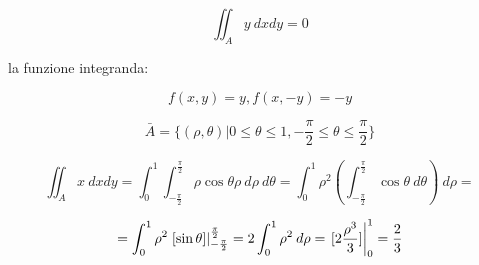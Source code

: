 \documentclass[../appunti-analisi.tex]{subfiles}
\begin{document}
\[
    \iint_A {y} \: d x d y =0 
\]

la funzione integranda:

\[
    f(x,y) = y, f(x,-y) = -y
\]

\[
    \bar{A} = \{(\rho,\theta) | 0 \le \theta \le 1, - \frac{\pi}{2} \le \theta \le \frac{\pi}{2}\}
\]

\[
    \iint_A {x} \: d x d y  = \int_{0}^{1} {\int_{- \frac{\pi}{2}}^{ \frac{\pi}{2}} {\rho \cos \theta \rho} \: d \rho } \: d \theta = \int_{0}^{1} {\rho^{2} \left(\int_{- \frac{\pi}{2}}^{ \frac{\pi}{2}} {\cos \theta} \: d \theta \right)} \: d \rho =  
\]

\[
    =\int_{0}^{1} {\rho^{2}\left.[\sin \theta]\right\rvert_{ - \frac{\pi}{2}}^{ \frac{\pi}{2}} } = 2 \int_{0}^{1} {\rho^{2}} \: d \rho = \left.[2 \frac{\rho^{3}}{3} ]\right\rvert_{0}^{1} = \frac{2}{3}
\]
\end{document}

